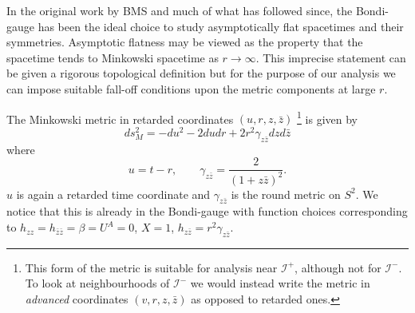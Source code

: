 \documentclass[a4paper,11pt]{article}
\numberwithin{equation}{section}
\begin{document}
In the original work by BMS and much of what has followed since, the Bondi-gauge has been the ideal choice to study asymptotically flat spacetimes and their symmetries. Asymptotic flatness may be viewed as the property that the spacetime tends to Minkowski spacetime as $r \rightarrow \infty$. This imprecise statement can be given a rigorous topological definition \cite{Wald:1984rg, Hawking:1973uf} but for the purpose of our analysis we can impose suitable fall-off conditions upon the metric components at large $r$. 

The Minkowski metric in retarded coordinates $(u,r,z,\bar{z})$ \footnote{This form of the metric is suitable for analysis near $\mathscr{I^+}$, although not for $\mathscr{I^-}$. To look at neighbourhoods of $\mathscr{I^-}$ we would instead write the metric in \textit{advanced} coordinates $(v,r,z,\bar{z})$ as opposed to retarded ones.} is given by 
\begin{equation}
ds_{M}^2=-du^2-2dudr+2r^2\gamma_{z \bar{z}}dzd\bar{z}
\end{equation} 
where 
\begin{equation}
u=t-r , \qquad \gamma_{z \bar{z}}=\frac{2}{(1+z\bar{z})^2}.
\end{equation}
$u$ is again a retarded time coordinate and $\gamma_{z\bar{z}}$ is the round metric on $S^2$. We notice that this is already in the Bondi-gauge with function choices corresponding to $h_{zz}=h_{\bar{z} \bar{z}}= \beta= U^A=0$, $X=1$, $h_{z \bar{z}}=r^2 \gamma_{z \bar{z}}$. 
\end{document}
